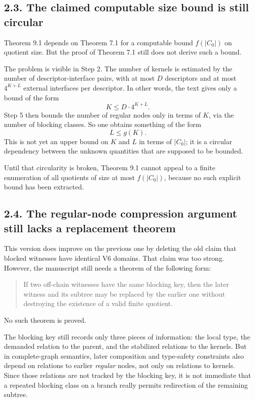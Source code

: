 \documentclass[11pt]{article}
\begin{document}
\subsection*{2.3. The claimed computable size bound is still circular}

Theorem 9.1 depends on Theorem 7.1 for a computable bound \(f(|C_0|)\) on quotient size. But the proof of Theorem 7.1 still does not derive such a bound.

The problem is visible in Step 2. The number of kernels is estimated by the number of descriptor-interface pairs, with at most \(D\) descriptors and at most \(4^{K+L}\) external interfaces per descriptor. In other words, the text gives only a bound of the form
\[
K \le D\cdot 4^{K+L}.
\]
Step 5 then bounds the number of regular nodes only in terms of \(K\), via the number of blocking classes. So one obtains something of the form
\[
L \le g(K).
\]
This is not yet an upper bound on \(K\) and \(L\) in terms of \(|C_0|\); it is a circular dependency between the unknown quantities that are supposed to be bounded.

Until that circularity is broken, Theorem 9.1 cannot appeal to a finite enumeration of all quotients of size at most \(f(|C_0|)\), because no such explicit bound has been extracted.

\subsection*{2.4. The regular-node compression argument still lacks a replacement theorem}

This version does improve on the previous one by deleting the old claim that blocked witnesses have identical V6 domains. That claim was too strong. However, the manuscript still needs a theorem of the following form:

\begin{quote}
If two off-chain witnesses have the same blocking key, then the later witness and its subtree may be replaced by the earlier one without destroying the existence of a valid finite quotient.
\end{quote}

No such theorem is proved.

The blocking key still records only three pieces of information: the local type, the demanded relation to the parent, and the stabilized relations to the kernels. But in complete-graph semantics, later composition and type-safety constraints also depend on relations to earlier \emph{regular} nodes, not only on relations to kernels. Since those relations are not tracked by the blocking key, it is not immediate that a repeated blocking class on a branch really permits redirection of the remaining subtree.
\end{document}

